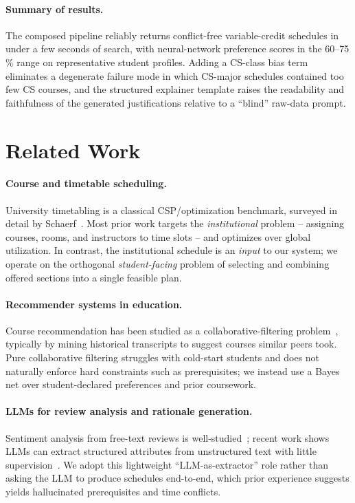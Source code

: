 \documentclass[10pt,letterpaper]{article}
\begin{document}
\paragraph{Summary of results.} The composed pipeline reliably returns
conflict-free variable-credit schedules in under a few seconds of search, with
neural-network preference scores in the 60--75\,\% range on representative
student profiles. Adding a CS-class bias term eliminates a degenerate failure
mode in which CS-major schedules contained too few CS courses, and the
structured explainer template raises the readability and faithfulness of the
generated justifications relative to a ``blind'' raw-data prompt.

\section{Related Work}

\paragraph{Course and timetable scheduling.} University timetabling is a
classical CSP/optimization benchmark, surveyed in detail by
Schaerf~\cite{Schaerf1999}. Most prior work targets the \emph{institutional}
problem -- assigning courses, rooms, and instructors to time slots -- and
optimizes over global utilization. In contrast, the institutional schedule is
an \emph{input} to our system; we operate on the orthogonal
\emph{student-facing} problem of selecting and combining offered sections
into a single feasible plan.

\paragraph{Recommender systems in education.} Course recommendation has been
studied as a collaborative-filtering problem~\cite{ParameswaranKoutrika2010,
PolyzouKarypis2019}, typically by mining historical transcripts to suggest
courses similar peers took. Pure
collaborative filtering struggles with cold-start students and does not
naturally enforce hard constraints such as prerequisites; we instead use a
Bayes net over student-declared preferences and prior coursework.

\paragraph{LLMs for review analysis and rationale generation.} Sentiment
analysis from free-text reviews is well-studied~\cite{PangLee2008};
recent work shows LLMs can extract structured attributes from
unstructured text with little supervision~\cite{Brown2020}. We adopt
this lightweight ``LLM-as-extractor'' role
rather than asking the LLM to produce schedules end-to-end, which prior
experience suggests yields hallucinated prerequisites and time conflicts.
\end{document}
